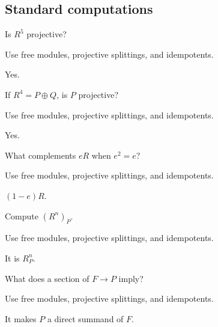 \subsection*{Standard computations}

\begin{exercise}\label{exr:v13-expand-01}
Is $R^5$ projective?
\end{exercise}
\begin{hint}
Use free modules, projective splittings, and idempotents.
\end{hint}
\begin{solution}
Yes.
\end{solution}

\begin{exercise}\label{exr:v13-expand-02}
If $R^4=P\oplus Q$, is $P$ projective?
\end{exercise}
\begin{hint}
Use free modules, projective splittings, and idempotents.
\end{hint}
\begin{solution}
Yes.
\end{solution}

\begin{exercise}\label{exr:v13-expand-03}
What complements $eR$ when $e^2=e$?
\end{exercise}
\begin{hint}
Use free modules, projective splittings, and idempotents.
\end{hint}
\begin{solution}
$(1-e)R$.
\end{solution}

\begin{exercise}\label{exr:v13-expand-04}
Compute $(R^n)_P$.
\end{exercise}
\begin{hint}
Use free modules, projective splittings, and idempotents.
\end{hint}
\begin{solution}
It is $R_P^n$.
\end{solution}

\begin{exercise}\label{exr:v13-expand-05}
What does a section of $F\to P$ imply?
\end{exercise}
\begin{hint}
Use free modules, projective splittings, and idempotents.
\end{hint}
\begin{solution}
It makes $P$ a direct summand of $F$.
\end{solution}

